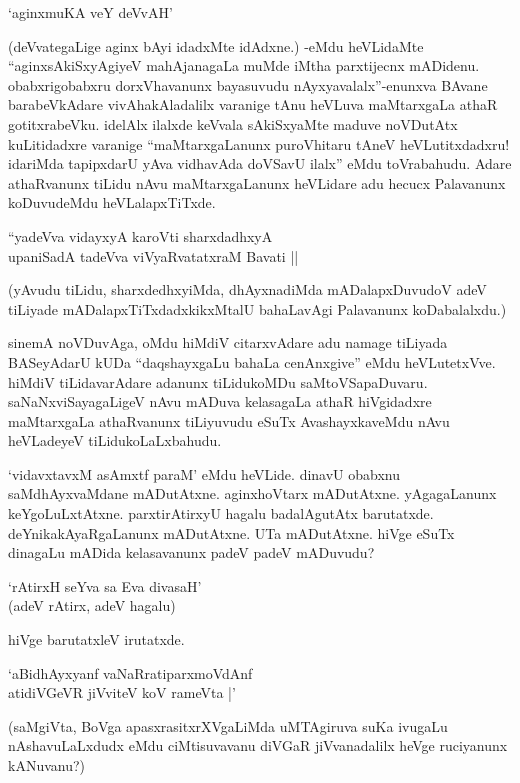 \begin{shloka}
`aginxmuKA veY deVvAH'
\end{shloka}

(deVvategaLige aginx bAyi idadxMte idAdxne.) -eMdu heVLidaMte ``aginxsAkiSxyAgiyeV mahAjanagaLa muMde iMtha parxtijecnx mADidenu. obabxrigobabxru dorxVhavanunx bayasuvudu nAyxyavalalx''-enunxva BAvane barabeVkAdare vivAhakAladalilx varanige tAnu heVLuva maMtarxgaLa athaR gotitxrabeVku. idelAlx ilalxde keVvala sAkiSxyaMte maduve noVDutAtx kuLitidadxre varanige ``maMtarxgaLanunx puroVhitaru tAneV heVLutitxdadxru! idariMda tapipxdarU yAva vidhavAda doVSavU ilalx'' eMdu toVrabahudu. Adare athaRvanunx tiLidu nAvu maMtarxgaLanunx heVLidare adu hecucx Palavanunx koDuvudeMdu heVLalapxTiTxde.

\begin{shloka}
``yadeVva vidayxyA karoVti sharxdadhxyA\\
upaniSadA tadeVva viVyaRvatatxraM Bavati ||
\end{shloka}

(yAvudu tiLidu, sharxdedhxyiMda, dhAyxnadiMda mADalapxDuvudoV adeV tiLiyade mADalapxTiTxdadxkikxMtalU bahaLavAgi Palavanunx koDabalalxdu.)

sinemA noVDuvAga, oMdu hiMdiV citarxvAdare adu namage tiLiyada BASeyAdarU kUDa ``daqshayxgaLu bahaLa cenAnxgive'' eMdu heVLutetxVve. hiMdiV tiLidavarAdare adanunx tiLidukoMDu saMtoVSapaDuvaru. saNaNxviSayagaLigeV nAvu mADuva kelasagaLa athaR hiVgidadxre maMtarxgaLa athaRvanunx tiLiyuvudu eSuTx AvashayxkaveMdu nAvu heVLadeyeV tiLidukoLaLxbahudu.

`vidavxtavxM asAmxtf paraM' eMdu heVLide. dinavU obabxnu saMdhAyxvaMdane mADutAtxne. aginxhoVtarx mADutAtxne. yAgagaLanunx keYgoLuLxtAtxne. parxtirAtirxyU hagalu badalAgutAtx barutatxde. deYnikakAyaRgaLanunx mADutAtxne. UTa mADutAtxne. hiVge eSuTx dinagaLu mADida kelasavanunx padeV padeV mADuvudu?

\begin{shloka}
`rAtirxH seYva sa Eva divasaH'\\
(adeV rAtirx, adeV hagalu)
\end{shloka}

hiVge barutatxleV irutatxde.

\begin{shloka}
`aBidhAyxyanf vaNaRratiparxmoVdAnf\\
atidiVGeVR jiVviteV koV rameVta |'
\end{shloka}

(saMgiVta, BoVga apasxrasitxrXVgaLiMda uMTAgiruva suKa ivugaLu nAshavuLaLxdudx eMdu ciMtisuvavanu diVGaR jiVvanadalilx heVge ruciyanunx kANuvanu?)

